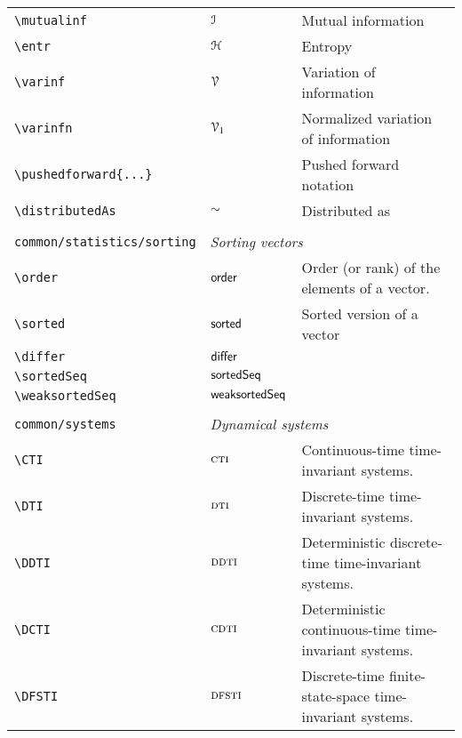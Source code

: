 \begin{longtable}{lll}
 {\color[rgb]{0.5,0.5,0.5}\texttt{\textbackslash mutualinf}} & $\mathcal{I}$ &  Mutual information\\ 
 {\color[rgb]{0.5,0.5,0.5}\texttt{\textbackslash entr}} & $\mathcal{H}$ &  Entropy\\ 
 {\color[rgb]{0.5,0.5,0.5}\texttt{\textbackslash varinf}} & $\mathcal{V}$ &  Variation of information\\ 
 {\color[rgb]{0.5,0.5,0.5}\texttt{\textbackslash varinfn}} & $\mathcal{V}_{1}$ &  Normalized variation of information\\ 
 {\color[rgb]{0.5,0.5,0.5}\texttt{\textbackslash pushedforward\{...\}}} &  &  Pushed forward notation\\ 
 {\color[rgb]{0.5,0.5,0.5}\texttt{\textbackslash distributedAs}} & $\sim$ &  Distributed as\\ 
  &  & \\ 
 {\color[rgb]{0.5,0.5,0.5}\texttt{common/statistics/sorting}} & \multicolumn{2}{l}{\emph{Sorting vectors}}\\ 
 \hline
{\color[rgb]{0.5,0.5,0.5}\texttt{\textbackslash order}} & $\mathsf{order}$ &  Order (or rank) of the elements of a vector.\\ 
 {\color[rgb]{0.5,0.5,0.5}\texttt{\textbackslash sorted}} & $\mathsf{sorted}$ &  Sorted version of a vector\\ 
 {\color[rgb]{0.5,0.5,0.5}\texttt{\textbackslash differ}} & $\mathsf{differ}$ & \\ 
 {\color[rgb]{0.5,0.5,0.5}\texttt{\textbackslash sortedSeq}} & $\mathsf{sortedSeq}$ & \\ 
 {\color[rgb]{0.5,0.5,0.5}\texttt{\textbackslash weaksortedSeq}} & $\mathsf{weaksortedSeq}$ & \\ 
  &  & \\ 
 {\color[rgb]{0.5,0.5,0.5}\texttt{common/systems}} & \multicolumn{2}{l}{\emph{Dynamical systems}}\\ 
 \hline
{\color[rgb]{0.5,0.5,0.5}\texttt{\textbackslash CTI}} & $\textsc{cti}$ &  Continuous-time time-invariant systems.\\ 
 {\color[rgb]{0.5,0.5,0.5}\texttt{\textbackslash DTI}} & $\textsc{dti}$ &  Discrete-time time-invariant systems.\\ 
 {\color[rgb]{0.5,0.5,0.5}\texttt{\textbackslash DDTI}} & $\textsc{ddti}$ &  Deterministic discrete-time time-invariant systems.\\ 
 {\color[rgb]{0.5,0.5,0.5}\texttt{\textbackslash DCTI}} & $\textsc{cdti}$ &  Deterministic continuous-time time-invariant systems.\\ 
 {\color[rgb]{0.5,0.5,0.5}\texttt{\textbackslash DFSTI}} & $\textsc{dfsti}$ &  Discrete-time finite-state-space time-invariant systems.\\ 

\end{longtable}

